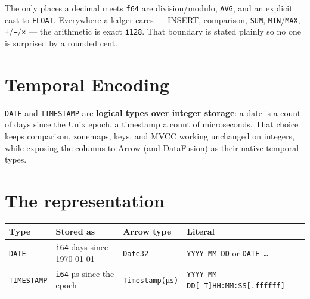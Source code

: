 \documentclass[
  11pt,
  openany]{book}
\begin{document}
The only places a decimal meets \texttt{f64} are division/modulo,
\texttt{AVG}, and an explicit cast to \texttt{FLOAT}. Everywhere a
ledger cares --- INSERT, comparison, \texttt{SUM},
\texttt{MIN}/\texttt{MAX}, \texttt{+}/\texttt{−}/\texttt{×} --- the
arithmetic is exact \texttt{i128}. That boundary is stated plainly so no
one is surprised by a rounded cent.

\section{Temporal Encoding}\label{temporal-encoding}

\texttt{DATE} and \texttt{TIMESTAMP} are \textbf{logical types over
integer storage}: a date is a count of days since the Unix epoch, a
timestamp a count of microseconds. That choice keeps comparison,
zonemaps, keys, and MVCC working unchanged on integers, while exposing
the columns to Arrow (and DataFusion) as their native temporal types.

\section{The representation}\label{the-representation}

\begin{longtable}[]{@{}
  >{\raggedright\arraybackslash}p{}
  >{\raggedright\arraybackslash}p{}
  >{\raggedright\arraybackslash}p{}
  >{\raggedright\arraybackslash}p{}@{}}
\toprule\noalign{}
\begin{minipage}[b]{\linewidth}\raggedright
Type
\end{minipage} & \begin{minipage}[b]{\linewidth}\raggedright
Stored as
\end{minipage} & \begin{minipage}[b]{\linewidth}\raggedright
Arrow type
\end{minipage} & \begin{minipage}[b]{\linewidth}\raggedright
Literal
\end{minipage} \\
\midrule\noalign{}
\endhead
\bottomrule\noalign{}
\endlastfoot
\texttt{DATE} & \texttt{i64} days since 1970-01-01 & \texttt{Date32} &
\texttt{\textquotesingle{}YYYY-MM-DD\textquotesingle{}} or
\texttt{DATE\ \textquotesingle{}…\textquotesingle{}} \\
\texttt{TIMESTAMP} & \texttt{i64} µs since the epoch &
\texttt{Timestamp(µs)} &
\texttt{\textquotesingle{}YYYY-MM-DD{[}\ T{]}HH:MM:SS{[}.ffffff{]}\textquotesingle{}} \\
\end{longtable}
\end{document}

